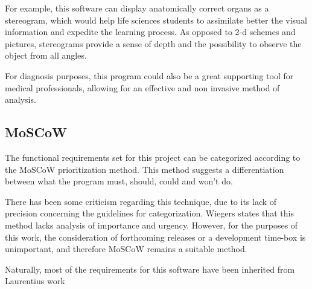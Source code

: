 \documentclass[12pt]{extarticle}
\begin{document}
For example, this software can display anatomically correct organs as a stereogram, which would help life sciences students to assimilate better the visual information and expedite the learning process. As opposed to 2-d schemes and pictures, stereograms provide a sense of depth and the possibility to observe the object from all angles.

For diagnosis purposes, this program could also be a great supporting tool for medical professionals, allowing for an effective and non invasive method of analysis.

\subsection{MoSCoW}
The functional requirements set for this project can be categorized according to the MoSCoW \cite{Moscow} prioritization method. This method suggests a differentiation between what the program must, should, could and won't do.

There has been some criticism regarding this technique, due to its lack of precision concerning the guidelines for categorization. Wiegers \cite{Wiegers} states that this method lacks analysis of importance and urgency. However, for the purposes of this work, the consideration of forthcoming releases or a development time-box is unimportant, and therefore MoSCoW remains a suitable method.

Naturally, most of the requirements for this software have been inherited from Laurentius work \cite{AV}
\end{document}
